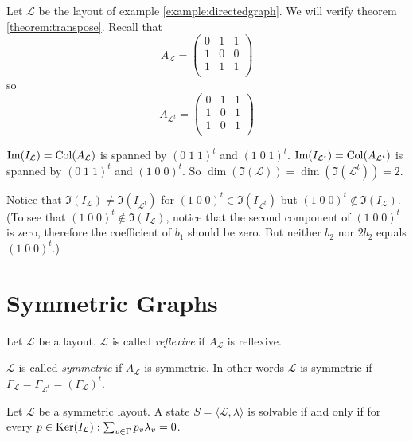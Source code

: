 \begin{example}
	Let $\mathcal{L}$ be the layout of example \ref{example:directedgraph}.
	We will verify theorem \ref{theorem:transpose}. Recall that 
	\[
		A_{\mathcal{L}} =
		\left(
		\begin{array}{ccc}
			0 & 1 & 1 \\
			1 & 0 & 0 \\
			1 & 1 & 1 \\
		\end{array}
		\right)
	\]
	so
	\[
		A_{\mathcal{L}^{t}} =
		\left(
		\begin{array}{ccc}
			0 & 1 & 1 \\
			1 & 0 & 1 \\
			1 & 0 & 1 \\
		\end{array}
		\right)
	\]
	
	$\operatorname{Im}(I_{\mathcal{L}}) = \operatorname{Col}(A_{\mathcal{L}})$ is spanned by
	$(0\;1\;1)^{t}$ and $(1\;0\;1)^{t}$. $\operatorname{Im}(I_{\mathcal{L}^{t}}) =
	\operatorname{Col}(A_{\mathcal{L}^{t}})$ is spanned by $(0\;1\;1)^{t}$ and
	$(1\;0\;0)^{t}$. So $\dim(\Im(\mathcal{L})) = \dim(\Im(\mathcal{L}^{t}))
	= 2$.
	
	Notice that $\Im(I_{\mathcal{L}}) \not= \Im(I_{\mathcal{L}^{t}})$ for
	$(1\;0\;0)^{t} \in \Im(I_{\mathcal{L}^{t}})$ but $(1\;0\;0)^{t} \not\in
	\Im(I_{\mathcal{L}})$. (To see that $(1\;0\;0)^{t} \not\in
	\Im(I_{\mathcal{L}})$, notice that the second component of
	$(1\;0\;0)^{t}$ is zero, therefore the coefficient of $b_{1}$ should be
	zero. But neither $b_{2}$ nor $2b_{2}$ equals $(1\;0\;0)^{t}$.)
\end{example}

\section{Symmetric Graphs}

\begin{definition}
	Let $\mathcal{L}$ be a layout. $\mathcal{L}$ is called \emph{reflexive}
	if $A_\mathcal{L}$ is reflexive.
	
	$\mathcal{L}$ is called \emph{symmetric} if $A_{\mathcal{L}}$ is
	symmetric. In other words $\mathcal{L}$ is symmetric if
	$\Gamma_{\mathcal{L}} = \Gamma_{\mathcal{L}^t} =
	(\Gamma_{\mathcal{L}})^t$.
\end{definition}

\begin{proposition}
	Let $\mathcal{L}$ be a symmetric layout. A state
	$S=\langle\mathcal{L},\lambda\rangle$ is solvable if and only if
	for every $p\in\operatorname{Ker}(I_{\mathcal{L}}): \sum_{v\in\Gamma}
	p_{v}\lambda_{v} = 0$.
\end{proposition}

